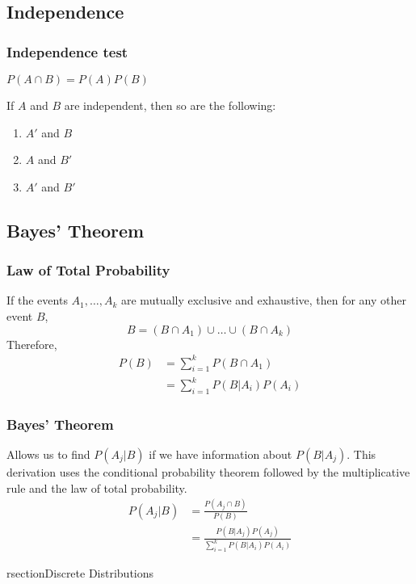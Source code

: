 \documentclass{article}
\begin{document}
\begin{multicols*}{2}
\subsection{Independence}

\subsubsection{Independence test}
$P(A \cap B) = P(A) P(B)$

If $A$ and $B$ are independent, then so are the following:
\begin{enumerate}
    \item $A'$ and $B$
    \item $A$ and $B'$
    \item $A'$ and $B'$
\end{enumerate}

\subsection{Bayes' Theorem}

\subsubsection{Law of Total Probability}
If the events $A_1, \ldots, A_k$ are mutually exclusive and exhaustive, then for any other event $B$,
\begin{equation*}
    B = (B \cap A_1) \cup \ldots \cup (B \cap A_k)
\end{equation*}
Therefore,
\begin{align*}
    P(B) &= \sum_{i = 1}^k P(B \cap A_1) \\
    &= \sum_{i = 1}^k P(B|A_i) P(A_i)
\end{align*}

\subsubsection{Bayes' Theorem}
Allows us to find $P(A_j|B)$ if we have information about $P(B|A_j)$. This derivation uses the conditional probability theorem followed by the multiplicative rule and the law of total probability.
\begin{align*}
    P(A_j|B) &= \frac{P(A_j \cap B)}{P(B)} \\
    &= \frac{P(B|A_j) P(A_j)}{\sum_{i = 1}^k P(B|A_i) P(A_i)}
\end{align*}

rsection{Discrete Distributions}


\end{multicols*}
\end{document}

